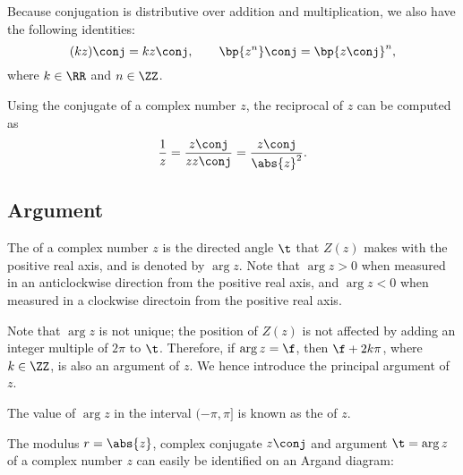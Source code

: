 Because conjugation is distributive over addition and multiplication, we also have the following identities: \[(kz)\conj = k z\conj, \qquad \bp{z^n}\conj = \bp{z\conj}^n,\] where $k \in \RR$ and $n \in \ZZ$.

Using the conjugate of a complex number $z$, the reciprocal of $z$ can be computed as \[\frac1{z} = \frac{z\conj}{z z\conj} = \frac{z \conj}{\abs{z}^2}.\]

\subsection{Argument}

\begin{definition}
    The  of a complex number $z$ is the directed angle $\t$ that $Z(z)$ makes with the positive real axis, and is denoted by $\arg{z}$. Note that $\arg{z} > 0$ when measured in an anticlockwise direction from the positive real axis, and $\arg{z} < 0$ when measured in a clockwise directoin from the positive real axis.
\end{definition}

Note that $\arg{z}$ is not unique; the position of $Z(z)$ is not affected by adding an integer multiple of $2\pi$ to $\t$. Therefore, if $\arg{z} = \f$, then $\f + 2k\pi$, where $k \in \ZZ$, is also an argument of $z$. We hence introduce the principal argument of $z$.

\begin{definition}
    The value of $\arg{z}$ in the interval $(-\pi, \pi]$ is known as the  of $z$.
\end{definition}

The modulus $r = \abs{z}$, complex conjugate $z\conj$ and argument $\t = \arg{z}$ of a complex number $z$ can easily be identified on an Argand diagram:

